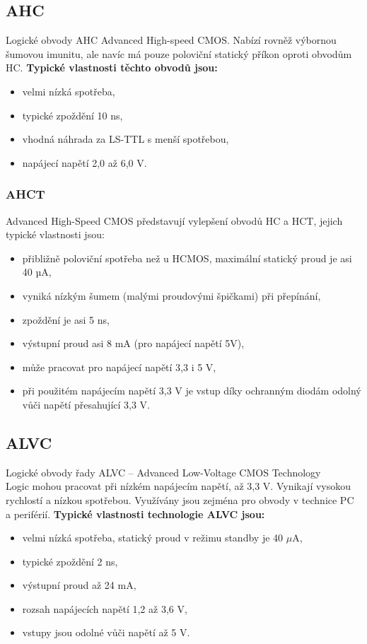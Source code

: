 \subsection{AHC}
Logické obvody AHC Advanced High-speed CMOS. Nabízí rovněž výbornou
šumovou imunitu, ale navíc má pouze poloviční statický příkon oproti obvodům HC.
\textbf{Typické vlastnosti těchto obvodů jsou:}\\
\begin{itemize}
\item velmi nízká spotřeba,
\item typické zpoždění 10 ns,
\item vhodná náhrada za LS-TTL s menší spotřebou,
\item napájecí napětí 2,0 až 6,0 V.
\end{itemize}
\subsubsection{AHCT}
Advanced High-Speed CMOS představují vylepšení obvodů HC a HCT, jejich typické vlastnosti jsou:
\begin{itemize}
\item přibližně poloviční spotřeba než u HCMOS, maximální statický proud je asi 40
µA,
\item vyniká nízkým šumem (malými proudovými špičkami) při přepínání,
\item zpoždění je asi 5 ns,
\item výstupní proud asi 8 mA (pro napájecí napětí 5V),
\item může pracovat pro napájecí napětí 3,3 i 5 V,
\item při použitém napájecím napětí 3,3 V je vstup díky ochranným diodám odolný
vůči napětí přesahující 3,3 V.
\end{itemize}

\subsection{ALVC}
Logické obvody řady ALVC – Advanced Low-Voltage CMOS Technology\\
Logic mohou pracovat při nízkém napájecím napětí, až 3,3 V. Vynikají vysokou rychlostí a nízkou spotřebou. Využívány jsou zejména pro obvody v technice PC a periférií.
\textbf{Typické vlastnosti technologie ALVC jsou:}\\
\begin{itemize}
\item velmi nízká spotřeba, statický proud v režimu standby je 40 $\mu$A,
\item typické zpoždění 2 ns,
\item výstupní proud až 24 mA,
\item rozsah napájecích napětí 1,2 až 3,6 V,
\item vstupy jsou odolné vůči napětí až 5 V.
\end{itemize}



